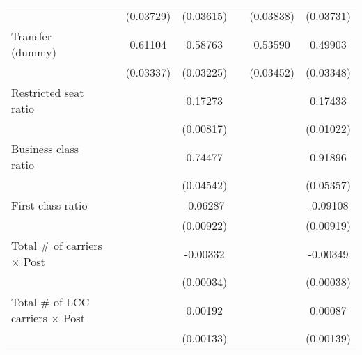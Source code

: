 \begin{table}[htbp]
\begin{tabular}{l*{6}{c}}
                    &                     &   (0.03729)         &   (0.03615)         &                     &   (0.03838)         &   (0.03731)         \\
\addlinespace
\shortstack{Transfer \\ (dummy)}&                     &     0.61104\sym{***}&     0.58763\sym{***}&                     &     0.53590\sym{***}&     0.49903\sym{***}\\
                    &                     &   (0.03337)         &   (0.03225)         &                     &   (0.03452)         &   (0.03348)         \\
\addlinespace
Restricted seat ratio&                     &                     &     0.17273\sym{***}&                     &                     &     0.17433\sym{***}\\
                    &                     &                     &   (0.00817)         &                     &                     &   (0.01022)         \\
\addlinespace
Business class ratio&                     &                     &     0.74477\sym{***}&                     &                     &     0.91896\sym{***}\\
                    &                     &                     &   (0.04542)         &                     &                     &   (0.05357)         \\
\addlinespace
First class ratio   &                     &                     &    -0.06287\sym{***}&                     &                     &    -0.09108\sym{***}\\
                    &                     &                     &   (0.00922)         &                     &                     &   (0.00919)         \\
\addlinespace
Total # of carriers $\times$ Post&                     &                     &    -0.00332\sym{***}&                     &                     &    -0.00349\sym{***}\\
                    &                     &                     &   (0.00034)         &                     &                     &   (0.00038)         \\
\addlinespace
Total # of LCC carriers $\times$ Post&                     &                     &     0.00192         &                     &                     &     0.00087         \\
                    &                     &                     &   (0.00133)         &                     &                     &   (0.00139)         \\

\end{tabular}
\end{table}
